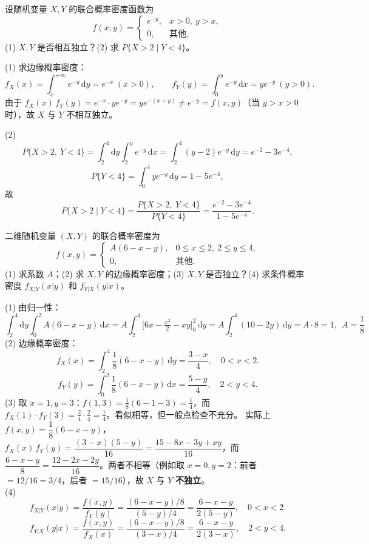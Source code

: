 ﻿\documentclass[lang=cn,11pt]{elegantbook}
\begin{document}
\begin{exercise}[判断独立性与条件概率] \label{exer:3-5d}
设随机变量 $X, Y$ 的联合概率密度函数为
\[
f(x,y) = \begin{cases} e^{-y}, & x > 0,\ y > x, \\ 0, & \text{其他}, \end{cases}
\]
(1) $X, Y$ 是否相互独立？(2) 求 $P\{X > 2 \mid Y < 4\}$。
\end{exercise}
\begin{solution}
(1) 求边缘概率密度：
\[
f_X(x) = \int_x^{+\infty} e^{-y}\,\mathrm{d}y = e^{-x}\ (x > 0), \qquad f_Y(y) = \int_0^y e^{-y}\,\mathrm{d}x = ye^{-y}\ (y > 0).
\]
由于 $f_X(x)\,f_Y(y) = e^{-x} \cdot ye^{-y} = ye^{-(x+y)} \neq e^{-y} = f(x,y)$（当 $y > x > 0$ 时），故 $X$ 与 $Y$ 不相互独立。

(2)
\[
P\{X > 2,\ Y < 4\} = \int_2^4\mathrm{d}y\int_2^y e^{-y}\,\mathrm{d}x = \int_2^4(y-2)e^{-y}\,\mathrm{d}y = e^{-2} - 3e^{-4},
\]
\[
P\{Y < 4\} = \int_0^4 ye^{-y}\,\mathrm{d}y = 1 - 5e^{-4},
\]
故
\[
P\{X > 2 \mid Y < 4\} = \frac{P\{X > 2,\ Y < 4\}}{P\{Y < 4\}} = \frac{e^{-2} - 3e^{-4}}{1 - 5e^{-4}}.
\]
\end{solution}


\begin{exercise} \label{exer:3-4b}
二维随机变量 $(X,Y)$ 的联合概率密度为
\[
f(x,y) = \begin{cases} A(6-x-y), & 0 \leqslant x \leqslant 2,\ 2 \leqslant y \leqslant 4, \\ 0, & \text{其他}. \end{cases}
\]
(1) 求系数 $A$；(2) 求 $X, Y$ 的边缘概率密度；(3) $X, Y$ 是否独立？(4) 求条件概率密度 $f_{X|Y}(x|y)$ 和 $f_{Y|X}(y|x)$。
\end{exercise}
\begin{solution}
(1) 由归一性：
\[
\int_2^4\mathrm{d}y\int_0^2 A(6-x-y)\,\mathrm{d}x = A\int_2^4\bigl[6x - \tfrac{x^2}{2} - xy\bigr]_0^2\,\mathrm{d}y = A\int_2^4(10 - 2y)\,\mathrm{d}y = A \cdot 8 = 1,~~A = \frac18
\]
(2) 边缘概率密度：
\[
f_X(x) = \int_2^4 \frac{1}{8}(6-x-y)\,\mathrm{d}y = \frac{3-x}{4}, \quad 0 < x < 2.
\]
\[
f_Y(y) = \int_0^2 \frac{1}{8}(6-x-y)\,\mathrm{d}x = \frac{5-y}{4}, \quad 2 < y < 4.
\]
(3) 取 $x=1, y=3$：$f(1,3) = \frac{1}{8}(6-1-3) = \frac{1}{4}$，而 $f_X(1) \cdot f_Y(3) = \frac{2}{4} \cdot \frac{2}{4} = \frac{1}{4}$。看似相等，但一般点检查不充分。
实际上 $f(x,y) = \dfrac{1}{8}(6-x-y)$，$f_X(x)\,f_Y(y) = \dfrac{(3-x)(5-y)}{16} = \dfrac{15 - 8x - 3y + xy}{16}$，而 $\dfrac{6-x-y}{8} = \dfrac{12 - 2x - 2y}{16}$。两者不相等（例如取 $x=0, y=2$：前者 $= 12/16 = 3/4$，后者 $= 15/16$），故 $X$ 与 $Y$ \textbf{不独立}。\\
(4)
\[
f_{X|Y}(x|y) = \frac{f(x,y)}{f_Y(y)} = \frac{(6-x-y)/8}{(5-y)/4} = \frac{6-x-y}{2(5-y)}, \quad 0 < x < 2.
\]
\[
f_{Y|X}(y|x) = \frac{f(x,y)}{f_X(x)} = \frac{(6-x-y)/8}{(3-x)/4} = \frac{6-x-y}{2(3-x)}, \quad 2 < y < 4.
\]
\end{solution}
\end{document}
